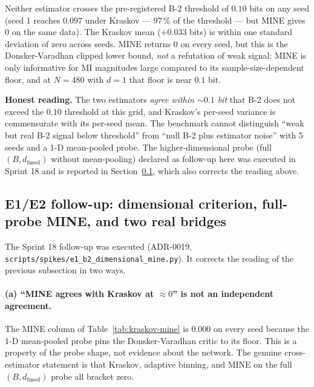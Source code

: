 \documentclass{article}
\begin{document}
Neither estimator crosses the pre-registered B-2 threshold of
$0.10$ bits on any seed (seed 1 reaches $0.097$ under Kraskov ---
$97\,\%$ of the threshold --- but MINE gives $0$ on the same
data). The Kraskov mean ($+0.033$ bits) is within one standard
deviation of zero across seeds. MINE returns $0$ on every seed,
but this is the Donsker-Varadhan clipped lower bound, \emph{not} a
refutation of weak signal: MINE is only informative for MI
magnitudes large compared to its sample-size-dependent floor, and
at $N = 480$ with $d = 1$ that floor is near $0.1$ bit.

\textbf{Honest reading.} The two estimators \emph{agree within
$\sim 0.1$ bit} that B-2 does not exceed the $0.10$ threshold at
this grid, and Kraskov's per-seed variance is commensurate with
its per-seed mean. The benchmark cannot distinguish
``weak but real B-2 signal below threshold'' from ``null B-2 plus
estimator noise'' with 5 seeds and a 1-D mean-pooled probe. The
higher-dimensional probe (full $(B, d_{\mathrm{fused}})$ without
mean-pooling) declared as follow-up here was executed in Sprint 18
and is reported in Section~\ref{sec:limitations-e1e2}, which also
corrects the reading above.

\subsection{E1/E2 follow-up: dimensional criterion, full-probe MINE, and two real bridges}
\label{sec:limitations-e1e2}

The Sprint 18 follow-up was executed (ADR-0019,
\texttt{scripts/spikes/e1\_b2\_dimensional\_mine.py}). It corrects the
reading of the previous subsection in two ways.

\paragraph{(a) ``MINE agrees with Kraskov at $\approx 0$'' is not an
independent agreement.} The MINE column of
Table~\ref{tab:kraskov-mine} is $0.000$ on every seed because the 1-D
mean-pooled probe pins the Donsker-Varadhan critic to its floor. This
is a property of the probe shape, not evidence about the network. The
genuine cross-estimator statement is that Kraskov, adaptive binning,
and MINE on the full $(B, d_{\mathrm{fused}})$ probe all bracket zero.
\end{document}
